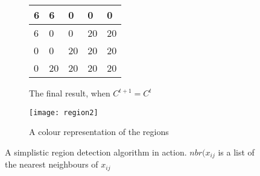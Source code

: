 \documentclass[../main.tex]{subfiles}
\begin{document}
\begin{figure}[H]
\begin{subfigure}[b]{0.45\textwidth}
\begin{tabular}{|p{1em}|p{1em}|p{1em}|p{1em}|p{1em}|}
          \hline
          6&6&0&0&0\\ \hline
          6&0&0&20&20\\ \hline
          0&0&20&20&20\\ \hline
          0&20&20&20&20\\  \hline
        \end{tabular}
        \caption{The final result, when $C^{t+1} = C^t$}
      \end{subfigure}
      \begin{subfigure}[b]{0.45\textwidth}
        \centering
        \texttt{[image: region2]}
        \caption{A colour representation of the regions}
      \end{subfigure}
      \caption{A simplistic region detection algorithm in action. $nbr(x_{ij}$ is a list of the nearest neighbours of $x_{ij}$}
      \label{simpleregion}
    \end{figure}
\end{document}
